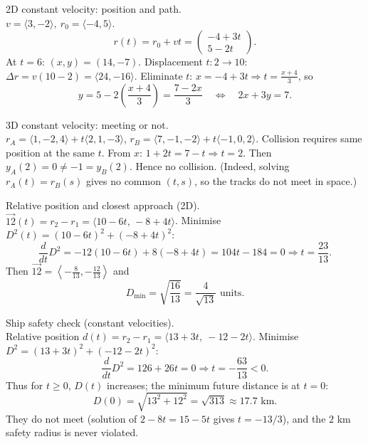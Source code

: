 \documentclass[11pt]{article}
\def\textbf#1{#1}%
\def\mathbf#1{#1}%
\begin{document}

\begin{solution}
\textbf{2D constant velocity: position and path.}\\
\(\mathbf{v}=\langle3,-2\rangle,\ \mathbf{r}_0=\langle-4,5\rangle\).
\[
\mathbf{r}(t)=\mathbf{r}_0+\mathbf{v}t=\begin{pmatrix}-4+3t\\ 5-2t\end{pmatrix}.
\]
At \(t=6\): \((x,y)=(14,-7)\).  
Displacement \(t:2\to10\): \(\Delta\mathbf{r}=\mathbf{v}(10-2)=\langle24,-16\rangle\).  
Eliminate \(t\): \(x=-4+3t\Rightarrow t=\frac{x+4}{3}\), so
\[
y=5-2\!\left(\frac{x+4}{3}\right)=\frac{7-2x}{3}\quad\Leftrightarrow\quad 2x+3y=7.
\]
\end{solution}

\begin{solution}
\textbf{3D constant velocity: meeting or not.}\\
\(\mathbf{r}_A=\langle1,-2,4\rangle+t\langle2,1,-3\rangle\),  
\(\mathbf{r}_B=\langle7,-1,-2\rangle+t\langle-1,0,2\rangle\).
Collision requires same position at the same \(t\). From \(x\): \(1+2t=7-t\Rightarrow t=2\).  
Then \(y_A(2)=0\neq -1=y_B(2)\). Hence no collision.  
(Indeed, solving \(\mathbf{r}_A(t)=\mathbf{r}_B(s)\) gives no common \((t,s)\), so the tracks do not meet in space.)
\end{solution}

\begin{solution}
\textbf{Relative position and closest approach (2D).}\\
\(\overrightarrow{1\!2}(t)=\mathbf{r}_2-\mathbf{r}_1=\langle 10-6t,\,-8+4t\rangle\).  
Minimise \(D^2(t)=(10-6t)^2+(-8+4t)^2\):
\[
\frac{d}{dt}D^2= -12(10-6t)+8(-8+4t)=104t-184=0\Rightarrow t=\frac{23}{13}.
\]
Then \(\overrightarrow{1\!2}=\left\langle-\frac{8}{13},-\frac{12}{13}\right\rangle\) and
\[
D_{\min}=\sqrt{\frac{16}{13}}=\frac{4}{\sqrt{13}}\text{ units}.
\]
\end{solution}

\begin{solution}
\textbf{Ship safety check (constant velocities).}\\
Relative position \( \mathbf{d}(t)=\mathbf{r}_2-\mathbf{r}_1=\langle 13+3t,\ -12-2t\rangle\).  
Minimise \(D^2=(13+3t)^2+(-12-2t)^2\):
\[
\frac{d}{dt}D^2=126+26t=0\Rightarrow t=-\frac{63}{13}<0.
\]
Thus for \(t\ge0\), \(D(t)\) increases; the minimum future distance is at \(t=0\):
\[
D(0)=\sqrt{13^2+12^2}=\sqrt{313}\approx17.7\text{ km}.
\]
They do not meet (solution of \(2-8t=15-5t\) gives \(t=-13/3\)), and the \(2\) km safety radius is never violated.
\end{solution}
\end{document}
